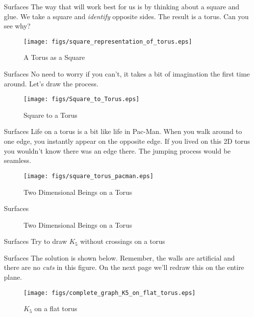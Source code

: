 \documentclass{beamer}
\begin{document}
    \begin{frame}{Surfaces}
        The way that will work best for us is by thinking about a square and glue.
        We take a square and \textit{identify} opposite sides. The result is a torus. Can you
        see why?
        \begin{figure}
            \centering
            \texttt{[image: figs/square\_representation\_of\_torus.eps]}
            \caption{A Torus as a Square}
            \label{fig:square_rep_of_torus}
        \end{figure}
    \end{frame}
    \begin{frame}{Surfaces}
        No need to worry if you can't, it takes a bit of imagination the first time around.
        Let's draw the process.
        \begin{figure}
            \centering
            \texttt{[image: figs/Square\_to\_Torus.eps]}
            \caption{Square to a Torus}
            \label{fig:square_to_torus}
        \end{figure}
    \end{frame}
    \begin{frame}{Surfaces}
        Life on a torus is a bit like life in Pac-Man. When you walk around to one edge, you
        instantly appear on the opposite edge. If you lived on this 2D torus you wouldn't know
        there was an edge there. The jumping process would be seamless.
        \begin{figure}
            \centering
            \texttt{[image: figs/square\_torus\_pacman.eps]}
            \caption{Two Dimensional Beings on a Torus}
            \label{fig:torus_pacman}
        \end{figure}
    \end{frame}
    \begin{frame}{Surfaces}
        \begin{figure}
            \centering
            \caption{Two Dimensional Beings on a Torus}
            \label{fig:torus_plane_pacman}
        \end{figure}
    \end{frame}
    \begin{frame}{Surfaces}
        Try to draw $K_{5}$ without crossings on a torus
    \end{frame}
    \begin{frame}{Surfaces}
        The solution is shown below. Remember, the walls are artificial and there are no
        \textit{cuts} in this figure. On the next page we'll redraw this on the entire plane.
        \begin{figure}
            \centering
            \texttt{[image: figs/complete\_graph\_K5\_on\_flat\_torus.eps]}
            \caption{$K_{5}$ on a flat torus}
            \label{fig:K_5_flat_torus}
        \end{figure}
    \end{frame}
\end{document}
